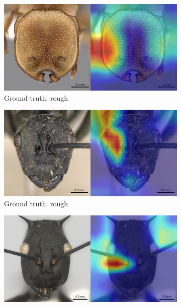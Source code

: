 \documentclass{aci}
\numberwithin{equation}{section}
\begin{document}
\begin{figure}
    \centering
    \begin{subfigure}{\subwidth}
        \includegraphics[width=1\linewidth]{thesis_assets/gradcam/correct_nonideal/346.png}
        \caption{Ground truth: rough}
        \label{fig:correct_nonideal_346}
    \end{subfigure}
    \begin{subfigure}{\subwidth}
        \includegraphics[width=1\linewidth]{thesis_assets/gradcam/correct_nonideal/1554.png}
        \caption{Ground truth: rough}
        \label{fig:correct_nonideal_1554}
    \end{subfigure}
    \begin{subfigure}{\subwidth}
        \includegraphics[width=1\linewidth]{thesis_assets/gradcam/correct_nonideal/1694.png}

\end{subfigure}
\end{figure}
\end{document}
